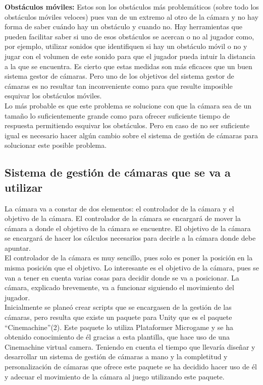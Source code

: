 \textbf{Obstáculos móviles:} Estos son los obstáculos más problemáticos (sobre todo los obstáculos móviles veloces) pues van de un extremo al otro de la cámara y no hay forma de saber cuándo hay un obstáculo y cuando no. Hay herramientas que pueden facilitar saber si uno de esos obstáculos se acercan o no al jugador como, por ejemplo, utilizar sonidos que identifiquen si hay un obstáculo móvil o no y jugar con el volumen de este sonido para que el jugador pueda intuir la distancia a la que se encuentra. Es cierto que estas medidas son más eficaces que un buen sistema gestor de cámaras. Pero uno de los objetivos del sistema gestor de cámaras es no resultar tan inconveniente como para que resulte imposible esquivar los obstáculos móviles.\\
Lo más probable es que este problema se solucione con que la cámara sea de un tamaño lo suficientemente grande como para ofrecer suficiente tiempo de respuesta permitiendo esquivar los obstáculos. Pero en caso de no ser suficiente igual es necesario hacer algún cambio sobre el sistema de gestión de cámaras para solucionar este posible problema.

\subsection{Sistema de gestión de cámaras que se va a utilizar}
La cámara va a constar de dos elementos: el controlador de la cámara y el objetivo de la cámara. El controlador de la cámara se encargará de mover la cámara a donde el objetivo de la cámara se encuentre. El objetivo de la cámara se encargará de hacer los cálculos necesarios para decirle a la cámara donde debe apuntar.\\
El controlador de la cámara es muy sencillo, pues solo es poner la posición en la misma posición que el objetivo. Lo interesante es el objetivo de la cámara, pues se van a tener en cuenta varias cosas para decidir donde se va a posicionar. La cámara, explicado brevemente, va a funcionar siguiendo el movimiento del jugador.\\
Inicialmente se planeó crear scripts que se encargasen de la gestión de las cámaras, pero resulta que existe un paquete para Unity que es el paquete “Cinemachine”(2). Este paquete lo utiliza Plataformer Microgame y se ha obtenido conocimiento de él gracias a esta plantilla, que hace uso de una Cinemachine virtual camera. Teniendo en cuenta el tiempo que llevaría diseñar y desarrollar un sistema de gestión de cámaras a mano y la completitud y personalización de cámaras que ofrece este paquete se ha decidido hacer uso de él y adecuar el movimiento de la cámara al juego utilizando este paquete.

